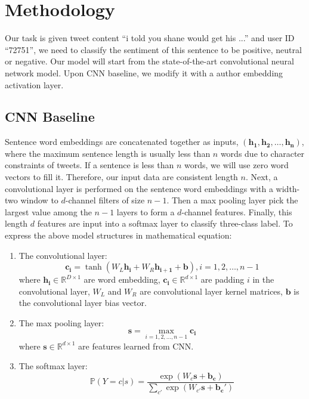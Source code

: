 \newcommand{\R}{\mathbb{R}}
\section{Methodology}
\label{Sec:methodology}

Our task is given tweet content ``i told you shane would get his ...'' and user ID ``72751'', we need to classify the sentiment of this sentence to be positive, neutral or negative. Our model will start from the state-of-the-art convolutional neural network model. Upon CNN baseline, we modify it with a author embedding activation layer. 
\subsection*{CNN Baseline}
Sentence word embeddings are concatenated together as inputs, $(\mathbf{h_1},\mathbf{h_2},\ldots,\mathbf{h_n})$, where the maximum sentence length is usually less than $n$ words due to character constraints of tweets. If a sentence is less than $n$ words, we will use zero word vectors to fill it. Therefore, our input data are consistent length $n$. Next, a convolutional layer is performed on the sentence word embeddings with a width-two window to $d$-channel filters of size $n-1$. Then a max pooling layer pick the largest value among the $n-1$ layers to form a $d$-channel features. Finally, this length $d$ features are input into a softmax layer to classify three-class label. To express the above model structures in mathematical equation:
\begin{enumerate}
	\item The convolutional layer:
\begin{equation}
	\mathbf{c_i} = \tanh(W_L\mathbf{h_i} + W_R \mathbf{h_{i+1}} + \mathbf{b}), i=1,2,\ldots,n-1
\end{equation}
where $\mathbf{h_i}\in \R^{D\times1}$ are word embedding, $\mathbf{c_i} \in \R^{d\times1}$ are padding $i$ in the convolutional layer, $W_L$ and $W_R$ are convolutional layer kernel matrices, $\mathbf{b}$ is the convolutional layer bias vector.
\item The max pooling layer:
\begin{equation}
	\mathbf{s} = \max_{i=1,2,\ldots,n-1}\mathbf{c_i}
\end{equation}
where $\mathbf{s} \in \R^{d \times 1}$ are features learned from CNN.
\item The softmax layer:
\begin{equation}
	\mathbb{P}(Y=c|s)=\frac{\exp(W_{c}\mathbf{s}+\mathbf{b_c})}{\sum_{c'}\exp(W_{c'}\mathbf{s}+\mathbf{b_c'})}
\end{equation}
\end{enumerate}

